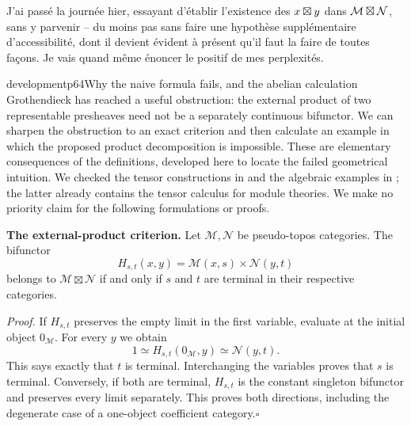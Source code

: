 J'ai passé la journée hier, essayant d'établir l'existence des $x\boxtimes y$ dans $\mathcal{M}\boxtimes\mathcal{N}$, sans y parvenir – du moins pas sans faire une hypothèse supplémentaire d'accessibilité,
dont il devient évident à présent qu'il faut la faire de toutes façons. Je vais quand même énoncer le positif de mes perplexités.

\begin{dcomment}{development}{p64}{Why the naive formula fails, and the abelian calculation}
Grothendieck has reached a useful obstruction: the external product of two representable presheaves need not be a separately continuous bifunctor. We can sharpen the obstruction to an exact criterion and then calculate an example in which the proposed product decomposition is impossible. These are elementary consequences of the definitions, developed here to locate the failed geometrical intuition. We checked the tensor constructions in \citet[Section~6.5]{Kelly1982} and the algebraic examples in \citet[p.~95]{Freyd1966}; the latter already contains the tensor calculus for module theories. We make no priority claim for the following formulations or proofs.

\textbf{The external-product criterion.}\ours{}\quad
Let $\mathcal M,\mathcal N$ be pseudo-topos categories. The bifunctor
\[
 H_{s,t}(x,y)=\mathcal M(x,s)\times\mathcal N(y,t)
\]
belongs to $\mathcal M\boxtimes\mathcal N$ if and only if $s$ and $t$ are terminal in their respective categories.

\emph{Proof.} If $H_{s,t}$ preserves the empty limit in the first variable, evaluate at the initial object $0_{\mathcal M}$. For every $y$ we obtain
\[
 1\simeq H_{s,t}(0_{\mathcal M},y)
 \simeq\mathcal N(y,t).
\]
This says exactly that $t$ is terminal. Interchanging the variables proves that $s$ is terminal. Conversely, if both are terminal, $H_{s,t}$ is the constant singleton bifunctor and preserves every limit separately. This proves both directions, including the degenerate case of a one-object coefficient category.\hfill$\square$


\end{dcomment}

